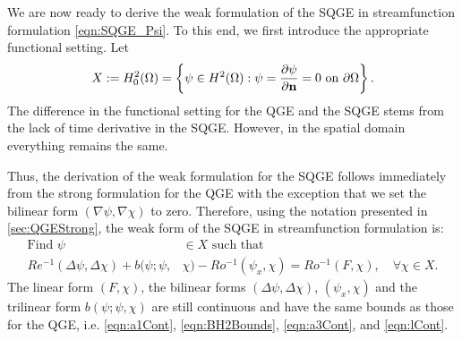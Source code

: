 We are now ready to derive the weak formulation of the SQGE in streamfunction
formulation \eqref{eqn:SQGE_Psi}. To this end, we first introduce the
appropriate functional setting. Let
\begin{equation*}
  X := H^2_0(\Omega) = \left\{ \psi\in H^2(\Omega): \psi=\frac{\partial\psi}{\partial {\bf n}}=0
    \text{ on } \partial\Omega \right\} .
\end{equation*}
The difference in the functional setting for the QGE and the SQGE stems from the
lack of time derivative in the SQGE. However, in the spatial domain everything
remains the same.

Thus, the derivation of the weak formulation for the SQGE follows immediately
from the strong formulation for the QGE with the exception that we set the
bilinear form $(\nabla \psi, \nabla \chi)$ to zero. Therefore, using the
notation presented in \autoref{sec:QGEStrong}, the weak form of the SQGE in streamfunction
formulation is:
\begin{equation}
  \begin{split}
    \text{Find }\psi &\in X \text{ such that} \\
    Re^{-1} (\Delta \psi, \Delta \chi) + b(\psi;\psi,&\chi) - Ro^{-1} (\psi_x,\chi) =
      Ro^{-1} (F,\chi),\quad \forall \chi \in X.  \end{split} \label{eqn:SQGEWF}
\end{equation}
The linear form $(F, \chi)$, the bilinear forms $(\Delta \psi, \Delta \chi)$,
$(\psi_x, \chi)$ and the trilinear form $b(\psi;\psi,\chi)$ are still continuous
\cite{Cayco86} and have the same bounds as those for the QGE, i.e.
\eqref{eqn:a1Cont}, \eqref{eqn:BH2Bounds}, \eqref{eqn:a3Cont}, and
\eqref{eqn:lCont}.

